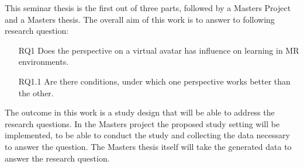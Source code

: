 This seminar thesis is the first out of three parts, followed by a Masters Project and a Masters thesis. The overall aim of this work is to answer to following research question:
\begin{itemize}
	\item[RQ1] Does the perspective on a virtual avatar has influence on learning in MR environments.
	\item[RQ1.1] Are there conditions, under which one perspective works better than the other.
\end{itemize}
The outcome in this work is a study design that will be able to address the research questions. In the Masters project the proposed study setting will be implemented, to be able to conduct the study and collecting the data necessary to answer the question. The Masters thesis itself will take the generated data to answer the research question.



